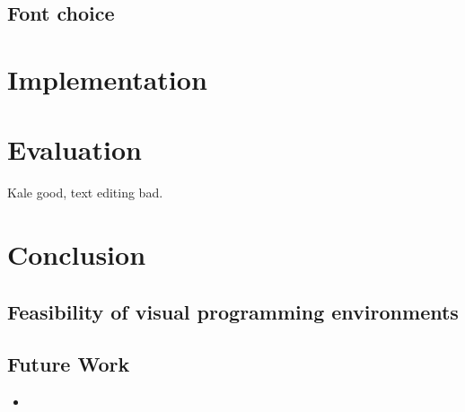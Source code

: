 \documentclass[11pt]{report}
\begin{document}
\section{Font choice}

\chapter{Implementation}

\chapter{Evaluation}

Kale good, text editing bad.

\chapter{Conclusion}

\section{Feasibility of visual programming environments}

\section{Future Work}

\begin{itemize}
	\item 
\end{itemize}

\endgroup %
\clearpage
\renewcommand*{\bibfont}{\raggedright} %

\end{document}

